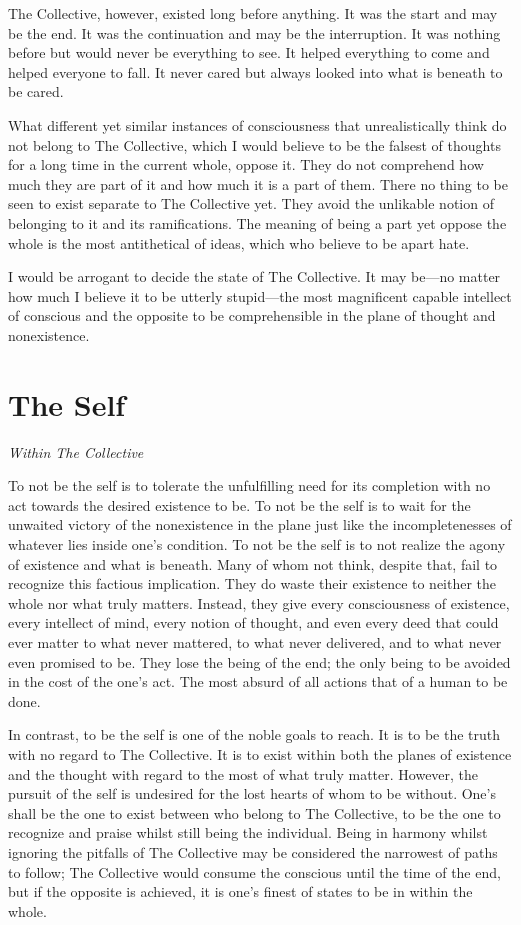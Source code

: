 \documentclass[twoside]{book}
\begin{document}
The Collective, however, existed long before anything. It was the start and may
be the end. It was the continuation and may be the interruption. It was nothing
before but would never be everything to see. It helped everything to come and
helped everyone to fall. It never cared but always looked into what is beneath
to be cared.

What different yet similar instances of consciousness that unrealistically think
do not belong to The Collective, which I would believe to be the falsest of
thoughts for a long time in the current whole, oppose it. They do not comprehend
how much they are part of it and how much it is a part of them. There no thing
to be seen to exist separate to The Collective yet. They avoid the unlikable
notion of belonging to it and its ramifications. The meaning of being a part yet
oppose the whole is the most antithetical of ideas, which who believe to be
apart hate.

I would be arrogant to decide the state of The Collective. It may be—no matter
how much I believe it to be utterly stupid—the most magnificent capable
intellect of conscious and the opposite to be comprehensible in the plane of
thought and nonexistence.

\section{The Self}
\textit{Within The Collective}

To not be the self is to tolerate the unfulfilling need for its
completion with no act towards the desired existence to be. To not be the self
is to wait for the unwaited victory of the nonexistence in the plane just like
the incompletenesses of whatever lies inside one's condition. To not be the self
is to not realize the agony of existence and what is beneath. Many of whom not
think, despite that, fail to recognize this factious implication. They do waste
their existence to neither the whole nor what truly matters. Instead, they give
every consciousness of existence, every intellect of mind, every notion of
thought, and even every deed that could ever matter to what never mattered, to
what never delivered, and to what never even promised to be. They lose the being
of the end; the only being to be avoided in the cost of the one's act. The most
absurd of all actions that of a human to be done.

In contrast, to be the self is one of the noble goals to reach. It is to be the
truth with no regard to The Collective. It is to exist within both the planes of
existence and the thought with regard to the most of what truly matter. However,
the pursuit of the self is undesired for the lost hearts of whom to be without.
One's shall be the one to exist between who belong to The Collective, to be the
one to recognize and praise whilst still being the individual. Being in harmony
whilst ignoring the pitfalls of The Collective may be considered the narrowest
of paths to follow; The Collective would consume the conscious until the time of
the end, but if the opposite is achieved, it is one's finest of states to be in
within the whole.
\end{document}
